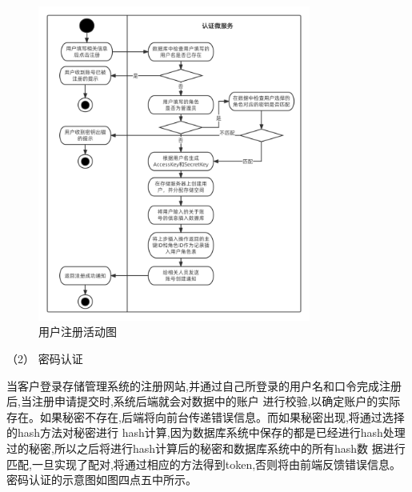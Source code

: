 \begin{figure}[h]
    \centering
    \includegraphics[width=0.8\textwidth]{my_figures/chapter4/用户注册活动图.png}
    \caption{用户注册活动图}
    \label{fig:用户注册活动图}
\end{figure}

（2） 密码认证


当客户登录存储管理系统的注册网站,并通过自己所登录的用户名和口令完成注册后,当注册申请提交时,系统后端就会对数据中的账户
进行校验,以确定账户的实际存在。如果秘密不存在,后端将向前台传递错误信息。而如果秘密出现,将通过选择的hash方法对秘密进行
hash计算,因为数据库系统中保存的都是已经进行hash处理过的秘密,所以之后将进行hash计算后的秘密和数据库系统中的所有hash数
据进行匹配,一旦实现了配对,将通过相应的方法得到token,否则将由前端反馈错误信息。密码认证的示意图如图四点五中所示。

